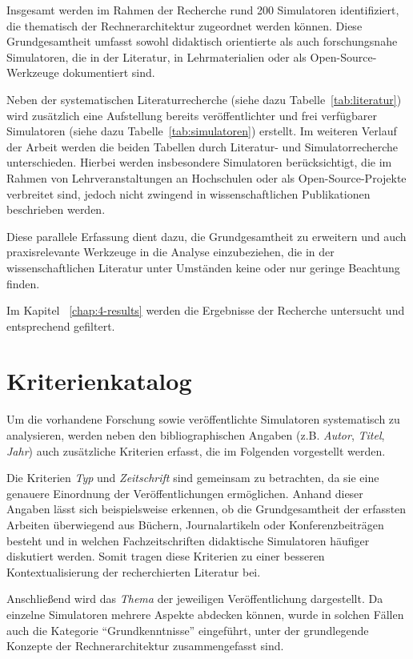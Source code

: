 Insgesamt werden im Rahmen der Recherche rund 200 Simulatoren identifiziert, die thematisch der Rechnerarchitektur zugeordnet werden können. Diese Grundgesamtheit umfasst sowohl didaktisch orientierte als auch forschungsnahe Simulatoren, die in der Literatur, in Lehrmaterialien oder als Open-Source-Werkzeuge dokumentiert sind.

Neben der systematischen Literaturrecherche (siehe dazu Tabelle~\ref{tab:literatur}) wird zusätzlich eine Aufstellung bereits veröffentlichter und frei verfügbarer Simulatoren (siehe dazu Tabelle~\ref{tab:simulatoren}) erstellt. Im weiteren Verlauf der Arbeit werden die beiden Tabellen durch Literatur- und Simulatorrecherche unterschieden. Hierbei werden insbesondere Simulatoren berücksichtigt, die im Rahmen von Lehrveranstaltungen an Hochschulen oder als Open-Source-Projekte verbreitet sind, jedoch nicht zwingend in wissenschaftlichen Publikationen beschrieben werden.

Diese parallele Erfassung dient dazu, die Grundgesamtheit zu erweitern und auch praxisrelevante Werkzeuge in die Analyse einzubeziehen, die in der wissenschaftlichen Literatur unter Umständen keine oder nur geringe Beachtung finden.

Im Kapitel ~\ref{chap:4-results} werden die Ergebnisse der Recherche untersucht und entsprechend gefiltert.

\section{Kriterienkatalog}\label{chap:kriterienkatalog}

Um die vorhandene Forschung sowie veröffentlichte Simulatoren systematisch zu analysieren, werden neben den bibliographischen Angaben (z.B. \textit{Autor}, \textit{Titel}, \textit{Jahr}) auch zusätzliche Kriterien erfasst, die im Folgenden vorgestellt werden.

Die Kriterien \textit{Typ} und \textit{Zeitschrift} sind gemeinsam zu betrachten, da sie eine genauere Einordnung der Veröffentlichungen ermöglichen. Anhand dieser Angaben lässt sich beispielsweise erkennen, ob die Grundgesamtheit der erfassten Arbeiten überwiegend aus Büchern, Journalartikeln oder Konferenzbeiträgen besteht und in welchen Fachzeitschriften didaktische Simulatoren häufiger diskutiert werden. Somit tragen diese Kriterien zu einer besseren Kontextualisierung der recherchierten Literatur bei.

Anschließend wird das \textit{Thema} der jeweiligen Veröffentlichung dargestellt. Da einzelne Simulatoren mehrere Aspekte abdecken können, wurde in solchen Fällen auch die Kategorie \enquote{Grundkenntnisse} eingeführt, unter der grundlegende Konzepte der Rechnerarchitektur zusammengefasst sind.

